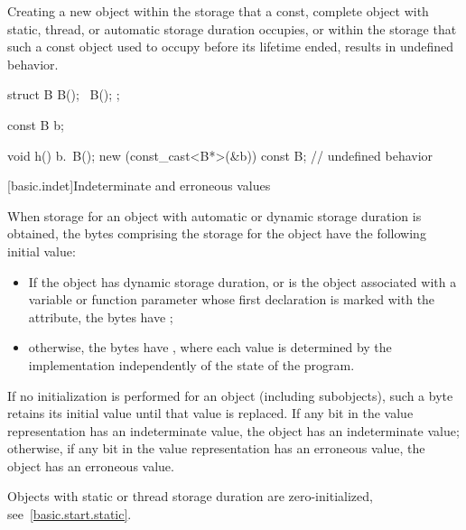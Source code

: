 \pnum
Creating a new object within the storage that a const, complete
object with static, thread, or automatic storage duration occupies,
or within the storage that such a const object used to occupy before
its lifetime ended, results in undefined behavior.
\begin{example}
\begin{codeblock}
struct B {
  B();
  ~B();
};

const B b;

void h() {
  b.~B();
  new (const_cast<B*>(&b)) const B;     // undefined behavior
}
\end{codeblock}
\end{example}

[basic.indet]{Indeterminate and erroneous values}

\pnum
When storage for an object with automatic or dynamic storage duration
is obtained,
the bytes comprising the storage for the object
have the following initial value:
\begin{itemize}
\item
If the object has dynamic storage duration, or
is the object associated with a variable or function parameter
whose first declaration is marked with
the \tcode{[[indeterminate]]} attribute,
the bytes have ;
\item
otherwise, the bytes have ,
where each value is determined by the implementation
independently of the state of the program.
\end{itemize}
If no initialization is performed for an object (including subobjects),
such a byte retains its initial value
until that value is replaced.
If any bit in the value representation has an indeterminate value,
the object has an indeterminate value;
otherwise, if any bit in the value representation has an erroneous value,
the object has an erroneous value.
\begin{note}
Objects with static or thread storage duration are zero-initialized,
see~\ref{basic.start.static}.
\end{note}

